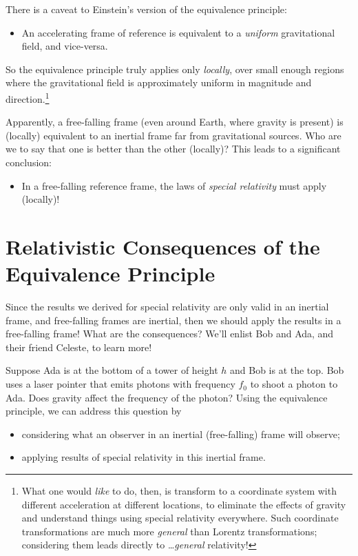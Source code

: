 \documentclass[11pt, letterpaper, openany]{book}
\begin{document}
There is a caveat to Einstein's version of the equivalence principle:
\begin{itemize}
    \item An accelerating frame of reference is equivalent to a \textit{uniform} gravitational field, and vice-versa.
\end{itemize}

So the equivalence principle truly applies only \textit{locally}, over small enough regions where the gravitational field is approximately uniform in magnitude and direction.\footnote{What one would \textit{like} to do, then, is transform to a coordinate system with different acceleration at different locations, to eliminate the effects of gravity and understand things using special relativity everywhere. Such coordinate transformations are much more \textit{general} than Lorentz transformations; considering them leads directly to \ldots \textit{general} relativity!}

Apparently, a free-falling frame (even around Earth, where gravity is present) is (locally) equivalent to an inertial frame far from gravitational sources. Who are we to say that one is better than the other (locally)? This leads to a significant conclusion:
\begin{itemize}
    \item In a free-falling reference frame, the laws of \textit{special relativity} must apply (locally)!
\end{itemize}

\section*{Relativistic Consequences of the Equivalence Principle}

Since the results we derived for special relativity are only valid in an inertial frame, and free-falling frames are inertial, then we should apply the results in a free-falling frame! What are the consequences? We'll enlist Bob and Ada, and their friend Celeste, to learn more!

Suppose Ada is at the bottom of a tower of height $h$ and Bob is at the top. Bob uses a laser pointer that emits photons with frequency $f_0$ to shoot a photon to Ada. Does gravity affect the frequency of the photon? Using the equivalence principle, we can address this question by
\begin{itemize}
    \item considering what an observer in an inertial (free-falling) frame will observe;
    \item applying results of special relativity in this inertial frame.
\end{itemize}
\end{document}
